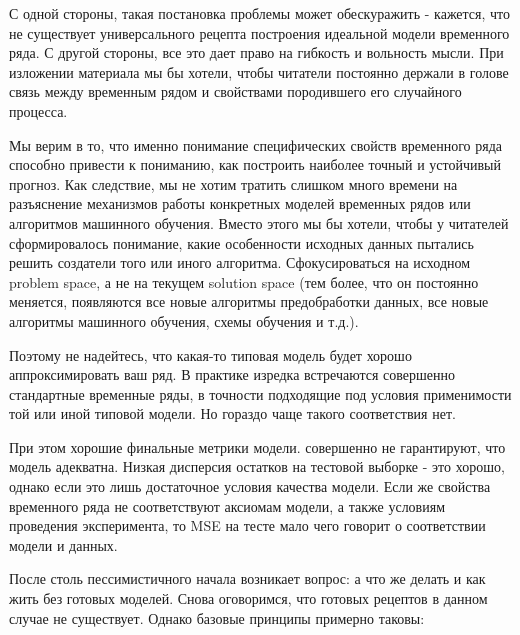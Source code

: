 С одной стороны, такая постановка проблемы может обескуражить -
кажется, что не существует универсального рецепта построения
идеальной модели временного ряда. С другой стороны, все это дает
право на гибкость и вольность мысли.
При изложении материала мы бы хотели, чтобы читатели постоянно
держали в голове связь между временным рядом и свойствами
породившего его случайного процесса.

Мы верим в то, что именно понимание специфических
свойств временного ряда способно привести к пониманию, как
построить наиболее точный и устойчивый прогноз. Как следствие, мы
не хотим тратить слишком много времени на разъяснение механизмов
работы конкретных моделей временных рядов или алгоритмов машинного
обучения. Вместо этого мы бы хотели, чтобы у читателей
сформировалось понимание, какие особенности исходных данных
пытались решить создатели того или иного алгоритма. Сфокусироваться
на исходном problem space, а не на текущем solution space
(тем более, что он постоянно меняется, появляются все новые алгоритмы
  предобработки данных, все новые алгоритмы машинного обучения, схемы
обучения и т.д.).

Поэтому не надейтесь, что какая-то типовая модель будет хорошо
аппроксимировать ваш ряд. В практике изредка встречаются совершенно стандартные
временные ряды, в точности подходящие под условия применимости той
или иной типовой модели. Но гораздо чаще такого соответствия нет.

При этом хорошие финальные метрики модели. совершенно не гарантируют,
что модель адекватна. Низкая дисперсия остатков на тестовой выборке -
это хорошо, однако если это лишь достаточное условия качества модели.
Если же свойства временного ряда не соответствуют аксиомам модели, а
также условиям проведения эксперимента, то MSE на тесте мало чего
говорит о соответствии модели и данных.

После столь пессимистичного начала возникает вопрос: а что же делать
и как жить без готовых моделей. Снова оговоримся, что готовых рецептов в
данном случае не существует. Однако базовые принципы примерно таковы:

